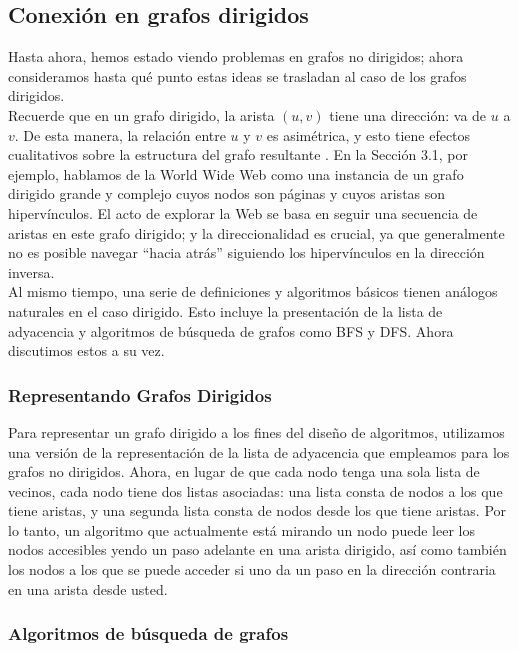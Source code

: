 \documentclass[a4paper, 12pt]{book}
\theoremstyle{dotless}
\begin{document}
\subsection{Conexión en grafos dirigidos}

Hasta ahora, hemos estado viendo problemas en grafos no dirigidos; ahora consideramos hasta qué punto estas ideas se trasladan al caso de los grafos dirigidos.\\

Recuerde que en un grafo dirigido, la arista $(u, v)$ tiene una dirección: va de $u$ a $v$. De esta manera, la relación entre $u$ y $v$ es asimétrica, y esto tiene efectos cualitativos sobre la estructura del grafo resultante . En la Sección 3.1, por ejemplo, hablamos de la World Wide Web como una instancia de un grafo dirigido grande y complejo cuyos nodos son páginas y cuyos aristas son hipervínculos. El acto de explorar la Web se basa en seguir una secuencia de aristas en este grafo dirigido; y la direccionalidad es crucial, ya que generalmente no es posible navegar ``hacia atrás'' siguiendo los hipervínculos en la dirección inversa.\\

Al mismo tiempo, una serie de definiciones y algoritmos básicos tienen análogos naturales en el caso dirigido. Esto incluye la presentación de la lista de adyacencia y algoritmos de búsqueda de grafos como BFS y DFS. Ahora discutimos estos a su vez.\\

\subsubsection*{Representando Grafos Dirigidos}

Para representar un grafo dirigido a los fines del diseño de algoritmos, utilizamos una versión de la representación de la lista de adyacencia que empleamos para los grafos no dirigidos. Ahora, en lugar de que cada nodo tenga una sola lista de vecinos, cada nodo tiene dos listas asociadas: una lista consta de nodos a los que tiene aristas, y una segunda lista consta de nodos desde los que tiene aristas. Por lo tanto, un algoritmo que actualmente está mirando un nodo puede leer los nodos accesibles yendo un paso adelante en una arista dirigido, así como también los nodos a los que se puede acceder si uno da un paso en la dirección contraria en una arista desde usted.\\

\subsubsection*{Algoritmos de búsqueda de grafos}
\end{document}
